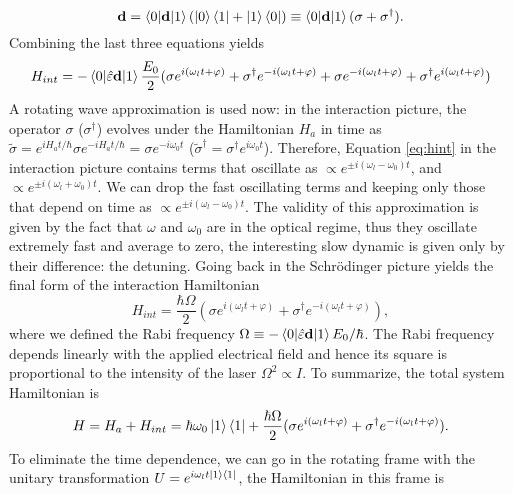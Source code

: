 \begin{equation}
\mathbf{d} = \braket{0|\mathbf{d}|1}\left(\ket{0}\bra{1} + \ket{1}\bra{0}\right) \equiv \braket{0|\mathbf{d}|1}(\sigma + \sigma^\dagger).
\end{equation}
Combining the last three equations yields
\begin{equation}
\label{eq:hint}
H_{int} = - \braket{0|\hat{\varepsilon} \mathbf{d}|1}\frac{E_0}{2}(\sigma e^{i(\omega_l t+\varphi)} + \sigma^\dagger e^{-i(\omega_l t+\varphi)} + \sigma e^{-i(\omega_l t+\varphi)} + \sigma^\dagger e^{i(\omega_l t+\varphi)})
\end{equation}
A rotating wave approximation is used now: in the interaction picture, the operator $\sigma$ ($\sigma^\dagger$) evolves under the Hamiltonian $H_a$ in time as $\widetilde{\sigma} = e^{i H_a t/\hbar}\sigma e^{-i H_a t/\hbar} = \sigma e^{-i\omega_0 t}$ ($\widetilde{\sigma}^\dagger=\sigma^\dagger e^{i\omega_0 t}$). Therefore, Equation \ref{eq:hint} in the interaction picture contains terms that oscillate as $\propto e^{\pm i(\omega_l-\omega_0 )t}$, and $\propto e^{\pm i(\omega_l+\omega_0 )t}$. We can drop the fast oscillating terms and keeping only those that depend on time as $\propto e^{\pm i(\omega_l-\omega_0 )t}$. The validity of this approximation is given by the fact that $\omega$ and $\omega_0$ are in the optical regime, thus they oscillate extremely fast and average to zero, the interesting slow dynamic is given only by their difference: the detuning.
Going back in the Schrödinger picture yields the final form of the interaction Hamiltonian
\begin{equation}
H_{int} = \frac{\hbar \Omega}{2}(\sigma e^{i(\omega_l t+\varphi)} + \sigma^\dagger e^{-i(\omega_l t+\varphi)}),
\end{equation}
 where we defined the Rabi frequency $\Omega \equiv - \braket{0|\hat{\varepsilon} \mathbf{d}|1}E_0/\hbar$. The Rabi frequency depends linearly with the applied electrical field and hence its square is proportional to the intensity of the laser $\Omega ^2 \propto I$. To summarize, the total system Hamiltonian is
 \begin{equation}
 \label{2levelatomhamiltonian}
H = H_a + H_{int} = \hbar\omega_0 \ket{1}\bra{1} + \frac{\hbar \Omega}{2}(\sigma e^{i(\omega_l t+\varphi)} + \sigma^\dagger e^{-i(\omega_l t+\varphi)}).
 \end{equation}
To eliminate the time dependence, we can go in the rotating frame with the unitary transformation $U = e^{i\omega_l t \ket{1}\bra{1}}$, the Hamiltonian in this frame is
